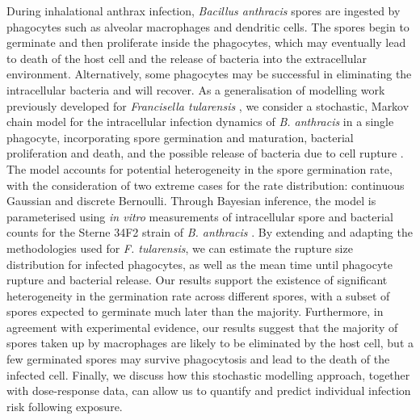 \documentclass[11pt,a4paper]{article}
\begin{document}
During inhalational anthrax infection, \textit{Bacillus anthracis} spores are ingested by phagocytes such as alveolar macrophages and dendritic cells. The spores begin to germinate and then proliferate inside the phagocytes, which may eventually lead to death of the host cell and the release of bacteria into the extracellular environment. Alternatively, some phagocytes may be successful in eliminating the intracellular bacteria and will recover. As a generalisation of modelling work previously developed for \textit{Francisella tularensis} \cite{carruthers}, we consider a stochastic, Markov chain model for the intracellular infection dynamics of \textit{B. anthracis} in a single phagocyte, incorporating spore germination and maturation, bacterial proliferation and death, and the possible release of bacteria due to cell rupture \cite{williams}. The model accounts for potential heterogeneity in the spore germination rate, with the consideration of two extreme cases for the rate distribution: continuous Gaussian and discrete Bernoulli. Through Bayesian inference, the model is parameterised using \textit{in vitro} measurements of intracellular spore and bacterial counts for the Sterne 34F2 strain of \textit{B. anthracis} \cite{kang, pantha}. By extending and adapting the methodologies used for \textit{F. tularensis}, we can estimate the rupture size distribution for infected phagocytes, as well as the mean time until phagocyte rupture and bacterial release. Our results support the existence of significant heterogeneity in the germination rate across different spores, with a subset of spores expected to germinate much later than the majority. Furthermore, in agreement with experimental evidence, our results suggest that the majority of spores taken up by macrophages are likely to be eliminated by the host cell, but a few germinated spores may survive phagocytosis and lead to the death of the infected cell. Finally, we discuss how this stochastic modelling approach, together with dose-response data, can allow us to quantify and predict individual infection risk following exposure.
 

\end{document}
